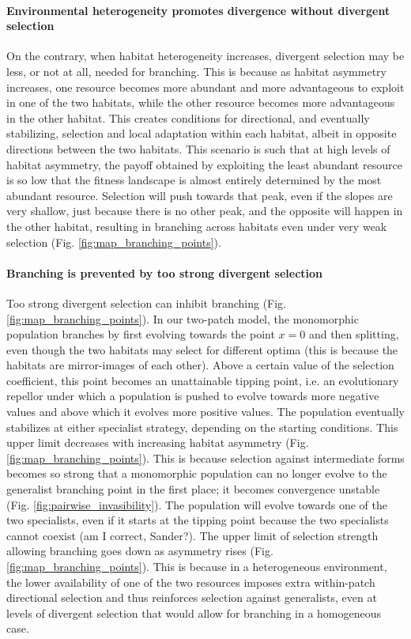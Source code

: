 \paragraph{Environmental heterogeneity promotes divergence without divergent selection} On the contrary, when habitat heterogeneity increases, divergent selection may be less, or not at all, needed for branching. This is because as habitat asymmetry increases, one resource becomes more abundant and more advantageous to exploit in one of the two habitats, while the other resource becomes more advantageous in the other habitat. This creates conditions for directional, and eventually stabilizing, selection and local adaptation within each habitat, albeit in opposite directions between the two habitats. This scenario is such that at high levels of habitat asymmetry, the payoff obtained by exploiting the least abundant resource is so low that the fitness landscape is almost entirely determined by the most abundant resource. Selection will push towards that peak, even if the slopes are very shallow, just because there is no other peak, and the opposite will happen in the other habitat, resulting in branching across habitats even under very weak selection (Fig. \ref{fig:map_branching_points}).\\


\paragraph{Branching is prevented by too strong divergent selection} Too strong divergent selection can inhibit branching (Fig. \ref{fig:map_branching_points}). In our two-patch model, the monomorphic population branches by first evolving towards the point $x = 0$ and then splitting, even though the two habitats may select for different optima (this is because the habitats are mirror-images of each other). Above a certain value of the selection coefficient, this point becomes an unattainable tipping point, i.e. an evolutionary repellor under which a population is pushed to evolve towards more negative values and above which it evolves more positive values. The population eventually stabilizes at either specialist strategy, depending on the starting conditions. This upper limit decreases with increasing habitat asymmetry (Fig. \ref{fig:map_branching_points}). This is because selection against intermediate forms becomes so strong that a monomorphic population can no longer evolve to the generalist branching point in the first place; it becomes convergence unstable (Fig. \ref{fig:pairwise_invasibility}). The population will evolve towards one of the two specialists, even if it starts at the tipping point because the two specialists cannot coexist (am I correct, Sander?). The upper limit of selection strength allowing branching goes down as asymmetry rises (Fig. \ref{fig:map_branching_points}). This is because in a heterogeneous environment, the lower availability of one of the two resources imposes extra within-patch directional selection and thus reinforces selection against generalists, even at levels of divergent selection that would allow for branching in a homogeneous case.\\

